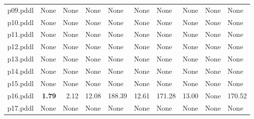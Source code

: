 \documentclass{article}
\begin{document}
\begin{tabular}{@{}lrrrrrrrrr@{}}
p09.pddl & \multicolumn{1}{|l|}{None} & \multicolumn{1}{|l|}{None} & \multicolumn{1}{|l|}{None} & \multicolumn{1}{|l|}{None} & \multicolumn{1}{|l|}{None} & \multicolumn{1}{|l|}{None} & \multicolumn{1}{|l|}{None} & \multicolumn{1}{|l|}{None} & \multicolumn{1}{|l|}{None} \\
p10.pddl & \multicolumn{1}{|l|}{None} & \multicolumn{1}{|l|}{None} & \multicolumn{1}{|l|}{None} & \multicolumn{1}{|l|}{None} & \multicolumn{1}{|l|}{None} & \multicolumn{1}{|l|}{None} & \multicolumn{1}{|l|}{None} & \multicolumn{1}{|l|}{None} & \multicolumn{1}{|l|}{None} \\
p11.pddl & \multicolumn{1}{|l|}{None} & \multicolumn{1}{|l|}{None} & \multicolumn{1}{|l|}{None} & \multicolumn{1}{|l|}{None} & \multicolumn{1}{|l|}{None} & \multicolumn{1}{|l|}{None} & \multicolumn{1}{|l|}{None} & \multicolumn{1}{|l|}{None} & \multicolumn{1}{|l|}{None} \\
p12.pddl & \multicolumn{1}{|l|}{None} & \multicolumn{1}{|l|}{None} & \multicolumn{1}{|l|}{None} & \multicolumn{1}{|l|}{None} & \multicolumn{1}{|l|}{None} & \multicolumn{1}{|l|}{None} & \multicolumn{1}{|l|}{None} & \multicolumn{1}{|l|}{None} & \multicolumn{1}{|l|}{None} \\
p13.pddl & \multicolumn{1}{|l|}{None} & \multicolumn{1}{|l|}{None} & \multicolumn{1}{|l|}{None} & \multicolumn{1}{|l|}{None} & \multicolumn{1}{|l|}{None} & \multicolumn{1}{|l|}{None} & \multicolumn{1}{|l|}{None} & \multicolumn{1}{|l|}{None} & \multicolumn{1}{|l|}{None} \\
p14.pddl & \multicolumn{1}{|l|}{None} & \multicolumn{1}{|l|}{None} & \multicolumn{1}{|l|}{None} & \multicolumn{1}{|l|}{None} & \multicolumn{1}{|l|}{None} & \multicolumn{1}{|l|}{None} & \multicolumn{1}{|l|}{None} & \multicolumn{1}{|l|}{None} & \multicolumn{1}{|l|}{None} \\
p15.pddl & \multicolumn{1}{|l|}{None} & \multicolumn{1}{|l|}{None} & \multicolumn{1}{|l|}{None} & \multicolumn{1}{|l|}{None} & \multicolumn{1}{|l|}{None} & \multicolumn{1}{|l|}{None} & \multicolumn{1}{|l|}{None} & \multicolumn{1}{|l|}{None} & \multicolumn{1}{|l|}{None} \\
p16.pddl & \textbf{1.79} & 2.12 & 12.08 & 188.39 & 12.61 & 171.28 & 13.00 & \multicolumn{1}{|l|}{None} & 170.52 \\
p17.pddl & \multicolumn{1}{|l|}{None} & \multicolumn{1}{|l|}{None} & \multicolumn{1}{|l|}{None} & \multicolumn{1}{|l|}{None} & \multicolumn{1}{|l|}{None} & \multicolumn{1}{|l|}{None} & \multicolumn{1}{|l|}{None} & \multicolumn{1}{|l|}{None} & \multicolumn{1}{|l|}{None} \\

\end{tabular}
\end{document}
